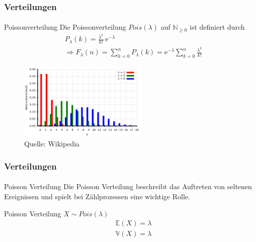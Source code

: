 \documentclass{beamer}
\begin{document}
\begin{frame}
    \frametitle{ Verteilungen}
\framesubtitle{}

\begin{block}{Poissonverteilung}
Die Poissonverteilung  $Pois (\lambda)$ auf $\mathbb{N}_{\geq 0}$ ist definiert durch
\begin{align*}
& P_\lambda (k) = \frac{\lambda^k}{k!}\, \mathrm{e}^{-\lambda} \\
& \Rightarrow F_{\lambda}(n)=\sum_{k=0}^n P_\lambda (k) = \mathrm{e}^{-\lambda} \sum_{k=0}^n \frac{\lambda^k}{k!}
\end{align*}
\end{block}
\begin{figure}[htp]
      \centering
    \includegraphics[width=0.55\textwidth]{img/Poisson}
      \caption{Quelle: Wikipedia}
\end{figure}
 \end{frame}



\begin{frame}
    \frametitle{ Verteilungen}
\framesubtitle{}

\begin{block}{Poisson Verteilung}
Die Poisson Verteilung beschreibt das Auftreten von seltenen Ereignissen und spielt bei Zählprozessen eine wichtige Rolle.
\end{block}
\begin{block}{Poisson Verteilung}
$X\sim Pois (\lambda)$ 
\begin{align*}
& \mathbb{E}(X) = \lambda \\
& \mathbb{V}(X) = \lambda
\end{align*}
\end{block}
 \end{frame}
\end{document}
